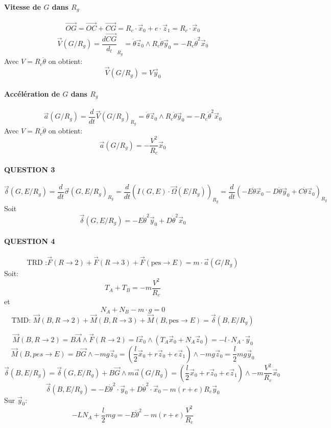 \paragraph{Vitesse de $G$ dans $R_g$}
\[\vec{OG} = \vec{OC} + \vec{CG} = R_c \cdot \vec x_0 + e\cdot \vec z_1 = R_c \cdot \vec x_0\]
\[\vec V(G/R_g) = \frac{d\vec{CG}}{d_t}_{R_g} = \dot \theta \vec z_0 \wedge R_c \dot \theta \vec y_0 = -R_c \dot \theta^2 \vec x_0 \]
Avec $ V = R_c \dot \theta$ on obtient:
\begin{equation}
	\vec V(G / R_g) =V \vec y_0
\end{equation}
\paragraph{Accélération de $G$ dans $R_g$}
\[\vec a(G/R_g) = \frac{d}{dt}\vec V(G/R_g)_{R_g} = \dot \theta \vec z_0 \wedge R_c \dot \theta \vec y_0 = - R_c \dot \theta^2 \vec x_0\]
Avec $V=R_c \dot \theta$ on obtient:
\begin{equation}
	\vec a(G/R_g) = - \frac{V^2}{R_c} \vec x_0
\end{equation}
\paragraph{QUESTION 3}
\[ \vec \delta (G, E / R_g) = \frac{d}{dt} \vec \sigma (G, E/R_g)_{R_g} = \frac{d}{dt} \left( I(G,E) \cdot \vec \Omega (E / R_g) \right)_{R_g} = \frac{d}{dt} \left( - E \dot \theta \vec x_0 - D \dot \theta \vec y_0 + C \dot \theta \vec z_0 \right)_{R_g} \]
Soit
\begin{equation}
	\vec \delta (G, E/R_g) = -E \dot \theta^2 \vec y_0 + D \dot \theta^2 \vec x_0
\end{equation}
\paragraph{QUESTION 4}
\[
	\text{TRD :} \vec F (R \rightarrow 2) + \vec F (R \rightarrow 3) + \vec F(\text{pes} \rightarrow E) = m\cdot \vec a(G/R_g)
\]
Soit:
\begin{equation}
	T_A + T_B = -m \frac{V^2}{R_c}
\end{equation}
et
\begin{equation}
	N_A + N_B - m\cdot g = 0
\end{equation}
\[
	\text{TMD: } \vec M(B,R \rightarrow 2) + \vec M(B,R \rightarrow 3) + \vec M(B, \text{pes} \rightarrow E) = \vec \delta(B,E / R_g)
\]

\[
	\vec M(B,R \rightarrow 2) = B\vec A \wedge \vec F (R \rightarrow 2) = l \vec x_0 \wedge (T_A \vec x_0 + N_A \vec z_0) = -l\cdot N_A \cdot \vec y_0
\]
\[
	\vec M(B, pes \rightarrow E) = B \vec G \wedge -mg\vec z_0 = (\frac{l}{2}\vec x_0 + r\vec z_0 + e \vec z_1)\wedge -mg\vec z_0 = \frac{l}{2}mg\vec y_0
\]
\[
	\vec \delta(B, E/R_g) = \vec \delta(G, E/R_g) + B\vec G \wedge m \vec a(G/R_g) = (\frac{l}{2}\vec x_0 + r\vec z_0 + e\vec z_1) \wedge -m \frac{V^2}{R_c} \vec x_0
\]
\[
	\vec \delta(B,E/R_g) = -E \dot \theta^2 \cdot \vec y_0 + D \dot \theta^2 \cdot \vec x_0 - m(r+e)R_c\vec y_0
\]
Sur $\vec y_0$:
\begin{equation}
	-LN_A + \frac{l}{2}mg = -E \dot \theta^2 - m(r+e)\frac{V^2}{R_c}
\end{equation}
